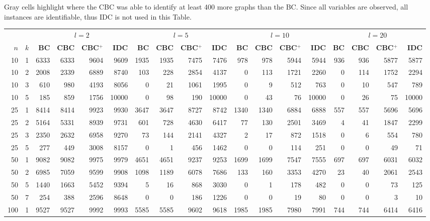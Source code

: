 {\begin{table}
{      Gray cells highlight where the CBC was able to identify at least 400 more graphs than the BC.
      Since all variables are observed, all instances are identifiable, thus IDC is not used in this Table.
}\label{table:global:stat:unobs0:count}
  \end{table}
\begin{table}
  \begin{center}
  \scriptsize
  \begin{tabular}{|rr | rrrr| rrrr| rrrr| rrrr|}
  \hline
   &&\multicolumn{4}{c|}{$l=2$} &\multicolumn{4}{c|}{$l=5$} &\multicolumn{4}{c|}{$l=10$} &\multicolumn{4}{c|}{$l=20$}\\
   \bfseries $n$ & \bfseries $k$
& \bfseries BC & \bfseries CBC & \bfseries CBC$^+$& \bfseries IDC
& \bfseries BC & \bfseries CBC & \bfseries CBC$^+$& \bfseries IDC
& \bfseries BC & \bfseries CBC & \bfseries CBC$^+$& \bfseries IDC
& \bfseries BC & \bfseries CBC & \bfseries CBC$^+$& \bfseries IDC
\\\hline
10&1&
6333&6333&9604&9609&1935&1935&7475&7476&978&978&5944&5944&936&936&5877&5877\\
10&2&
2008&2339&6889&8740&   103&228&2854&4137&     0&113&1721&2260&      0&114&1752&2294\\
10&3&
610&980&4193&8056&0&21&1061&1995&0&9&512&763&0&10&547&789\\
10&5&
\cellcolor[gray]{0.85}185&\cellcolor[gray]{0.85}859&1756&10000&0&98&190&10000&0&43&76&10000&0&26&75&10000\\
\hline
25&1&
8414&8414&9923&9930&3647&3647&8727&8742&1340&1340&6884&6888&557&557&5696&5696\\
25&2&
5164&5331&8939&9731&   601&728&4630&6417&  77&130&2501&3469&    4&41&1847&2299\\
25&3&
2350&2632&6958&9270&73&144&2141&4327&2&17&872&1518&0&6&554&780\\
25&5&
277&449&3008&8157&0&1&456&1462&0&0&114&251&0&0&49&71\\
\hline
50&1&
9082&9082&9975&9979&4651&4651&9237&9253&1699&1699&7547&7555&697&697&6031&6032\\
50&2&
6985&7059&9599&9908&      1098&1189&6078&7686&     133&160&3353&4270&      23&40&2061&2543\\
50&5&
1440&1663&5452&9394&      5&16&868&3030&        0&1&178&482&         0&0&73&125\\
50&7&
254&388&2596&8648&      0&0&186&1226&        0&0&19&80&       0&0&3&10\\
\hline
100&1&
9527&9527&9992&9993&5585&5585&9602&9618&1985&1985&7980&7991&744&744&6414&6416\\

\end{tabular}
\end{center}
\end{table}}
